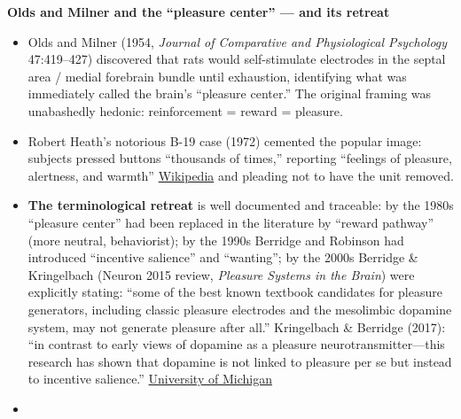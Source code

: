 \textbf{Olds and Milner and the ``pleasure center'' --- and its retreat}

\begin{itemize}
\tightlist
\item
  Olds and Milner (1954, \emph{Journal of Comparative and Physiological Psychology} 47:419--427) discovered that rats would self-stimulate electrodes in the septal area / medial forebrain bundle until exhaustion, identifying what was immediately called the brain's ``pleasure center.'' The original framing was unabashedly hedonic: reinforcement = reward = pleasure.
\item
  Robert Heath's notorious B-19 case (1972) cemented the popular image: subjects pressed buttons ``thousands of times,'' reporting ``feelings of pleasure, alertness, and warmth'' \href{https://en.wikipedia.org/wiki/Brain_stimulation_reward}{Wikipedia} and pleading not to have the unit removed.
\item
  \textbf{The terminological retreat} is well documented and traceable: by the 1980s ``pleasure center'' had been replaced in the literature by ``reward pathway'' (more neutral, behaviorist); by the 1990s Berridge and Robinson had introduced ``incentive salience'' and ``wanting''; by the 2000s Berridge \& Kringelbach (Neuron 2015 review, \emph{Pleasure Systems in the Brain}) were explicitly stating: ``some of the best known textbook candidates for pleasure generators, including classic pleasure electrodes and the mesolimbic dopamine system, may not generate pleasure after all.'' Kringelbach \& Berridge (2017): ``in contrast to early views of dopamine as a pleasure neurotransmitter---this research has shown that dopamine is not linked to pleasure per se but instead to incentive salience.'' \href{https://sites.lsa.umich.edu/berridge-lab/wp-content/uploads/sites/743/2019/10/2017-Kringelbach-Berridge-Affective-core-Emotion-Rev-1.pdf}{University of Michigan}
\item

\end{itemize}
